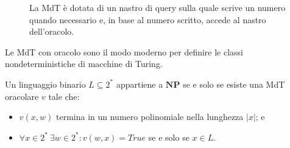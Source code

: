 \begin{figure}[h]
\begin{center}
\begin{tikzpicture}[x=0.75pt,y=0.75pt,yscale=-1,xscale=1]
		\end{tikzpicture}

	\end{center}
	\caption{La MdT è dotata di un nastro di query sulla quale scrive un numero quando necessario e, in base al numero scritto, accede al nastro dell'oracolo.}
	\label{fig:mdtoracle}
\end{figure}

Le MdT con oracolo sono il modo moderno per definire le classi nondeterministiche di macchine
di Turing.

\begin{theorem}
	Un linguaggio binario $L \subseteq 2^*$ appartiene a $\mathbf{NP}$ se e solo
	se esiste una MdT oracolare $v$ tale che:
	\begin{itemize}
		\item $v(x,w)$ termina in un numero polinomiale nella lunghezza $|x|$; e
		\item $\forall x \in 2^* ~ \exists w \in 2^* : v(w,x) = True$
		      se e solo se $x \in L$.
	\end{itemize}
\end{theorem}


